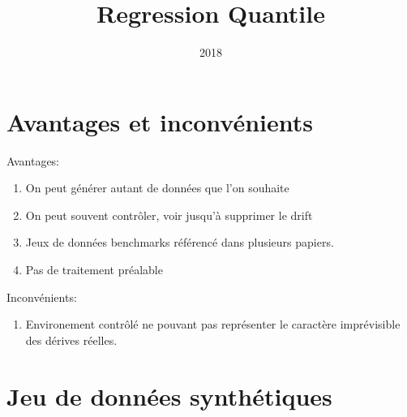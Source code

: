 \documentclass[11pt,a4paper]{report}
\title{Regression Quantile}
\date{2018}
\begin{document}







\section*{Avantages et inconvénients}

Avantages:
\begin{enumerate}
\item On peut générer autant de données que l’on souhaite
\item On peut souvent contrôler, voir jusqu'à supprimer le drift
\item Jeux de données benchmarks référencé dans plusieurs papiers.
\item Pas de traitement préalable
\end{enumerate}

Inconvénients:
\begin{enumerate}
\item Environement contrôlé ne pouvant pas représenter le caractère imprévisible des dérives réelles.
\end{enumerate}
\section*{Jeu de données synthétiques}
\end{document}
